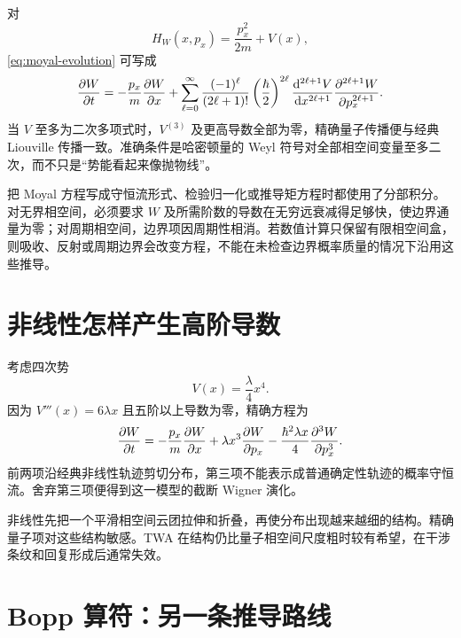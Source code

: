 对
\begin{equation}
  H_W(x,p_x)=\frac{p_x^2}{2m}+V(x),
\end{equation}
\cref{eq:moyal-evolution} 可写成
\begin{equation}
  \frac{\partial W}{\partial t}
  =-\frac{p_x}{m}\frac{\partial W}{\partial x}
  +\sum_{\ell=0}^{\infty}
  \frac{(-1)^\ell}{(2\ell+1)!}
  \left(\frac{\hbar}{2}\right)^{2\ell}
  \frac{\mathop{}\!\mathrm{d}^{2\ell+1}V}{\mathop{}\!\mathrm{d} x^{2\ell+1}}
  \frac{\partial^{2\ell+1}W}{\partial p_x^{2\ell+1}}.
  \label{eq:moyal-potential-series}
\end{equation}
当 $V$ 至多为二次多项式时，$V^{(3)}$ 及更高导数全部为零，精确量子传播便与经典 Liouville 传播一致。准确条件是哈密顿量的 Weyl 符号对全部相空间变量至多二次，而不只是“势能看起来像抛物线”。

把 Moyal 方程写成守恒流形式、检验归一化或推导矩方程时都使用了分部积分。对无界相空间，必须要求 $W$ 及所需阶数的导数在无穷远衰减得足够快，使边界通量为零；对周期相空间，边界项因周期性相消。若数值计算只保留有限相空间盒，则吸收、反射或周期边界会改变方程，不能在未检查边界概率质量的情况下沿用这些推导。

\section{非线性怎样产生高阶导数}

考虑四次势
\begin{equation}
  V(x)=\frac{\lambda}{4}x^4.
\end{equation}
因为 $V'''(x)=6\lambda x$ 且五阶以上导数为零，精确方程为
\begin{equation}
  \frac{\partial W}{\partial t}
  =-\frac{p_x}{m}\frac{\partial W}{\partial x}
  +\lambda x^3\frac{\partial W}{\partial p_x}
  -\frac{\hbar^2\lambda x}{4}\frac{\partial^3W}{\partial p_x^3}.
  \label{eq:quartic-wigner-evolution}
\end{equation}
前两项沿经典非线性轨迹剪切分布，第三项不能表示成普通确定性轨迹的概率守恒流。舍弃第三项便得到这一模型的截断 Wigner 演化。

\begin{intuitionbox}
非线性先把一个平滑相空间云团拉伸和折叠，再使分布出现越来越细的结构。精确量子项对这些结构敏感。TWA 在结构仍比量子相空间尺度粗时较有希望，在干涉条纹和回复形成后通常失效。
\end{intuitionbox}

\section{Bopp 算符：另一条推导路线}

